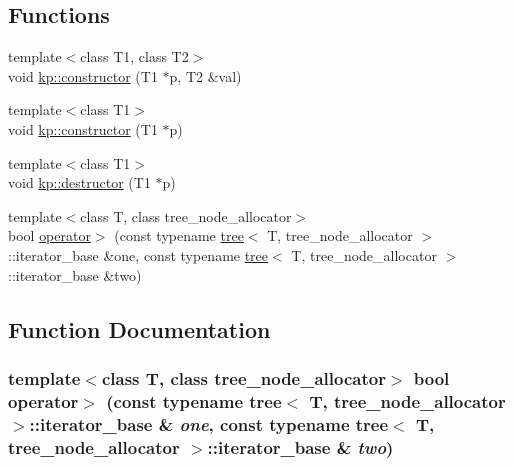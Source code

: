 \subsection*{Functions}
\begin{CompactItemize}
\item 
{\footnotesize template$<$class T1, class T2$>$ }\\void \hyperlink{namespacekp_d1c6c23984a78bfc8336c7ca244d6f1c}{kp::constructor} (T1 $\ast$p, T2 \&val)
\item 
{\footnotesize template$<$class T1$>$ }\\void \hyperlink{namespacekp_b625db515f044b7ddaa92769e2e6d745}{kp::constructor} (T1 $\ast$p)
\item 
{\footnotesize template$<$class T1$>$ }\\void \hyperlink{namespacekp_a6813c11eeb1c091cdd1eff62de70914}{kp::destructor} (T1 $\ast$p)
\item 
{\footnotesize template$<$class T, class tree\_\-node\_\-allocator$>$ }\\bool \hyperlink{tree_8hh_81baa38a17ce93e70e336d8df3b8e6e7}{operator$>$} (const typename \hyperlink{classtree}{tree}$<$ T, tree\_\-node\_\-allocator $>$::iterator\_\-base \&one, const typename \hyperlink{classtree}{tree}$<$ T, tree\_\-node\_\-allocator $>$::iterator\_\-base \&two)
\end{CompactItemize}


\subsection{Function Documentation}
\hypertarget{tree_8hh_81baa38a17ce93e70e336d8df3b8e6e7}{
\subsubsection{\setlength{\rightskip}{0pt plus 5cm}template$<$class T, class tree\_\-node\_\-allocator$>$ bool operator$>$ (const typename {\bf tree}$<$ T, tree\_\-node\_\-allocator $>$::iterator\_\-base \& {\em one}, \/  const typename {\bf tree}$<$ T, tree\_\-node\_\-allocator $>$::iterator\_\-base \& {\em two})}}
\label{tree_8hh_81baa38a17ce93e70e336d8df3b8e6e7}


